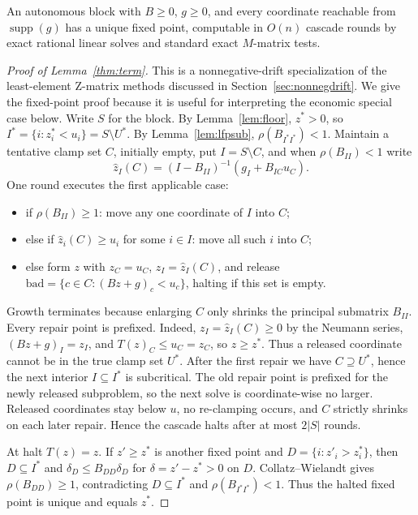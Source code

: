 \documentclass{llncs}
\begin{document}
\begin{lemma}
\label{thm:term}
An autonomous block with \(B\ge0\), \(g\ge0\), and every coordinate reachable from \(\operatorname{supp}(g)\) has a unique fixed point, computable in \(O(n)\) cascade rounds by exact rational linear solves and standard exact \(M\)-matrix tests.
\end{lemma}

\begin{proof}[Proof of Lemma~\ref{thm:term}]
This is a nonnegative-drift specialization of the least-element Z-matrix methods discussed in Section~\ref{sec:nonnegdrift}. We give the fixed-point proof because it is useful for interpreting the economic special case below.
Write \(S\) for the block. By Lemma~\ref{lem:floor}, \(z^\ast>0\), so \(I^\ast=\{i:z^\ast_i<u_i\}=S\setminus U^\ast\). By Lemma~\ref{lem:lfpsub}, \(\rho(B_{I^\ast I^\ast})<1\). Maintain a tentative clamp set \(C\), initially empty, put \(I=S\setminus C\), and when \(\rho(B_{II})<1\) write
\[
        \hat z_I(C)=(I-B_{II})^{-1}(g_I+B_{IC}u_C).
\]
One round executes the first applicable case:
\begin{itemize}[leftmargin=2.2em,itemsep=1pt]
\item[\textup{(G1)}] if \(\rho(B_{II})\ge1\): move any one coordinate of \(I\) into \(C\);
\item[\textup{(G2)}] else if \(\hat z_i(C)\ge u_i\) for some \(i\in I\): move all such \(i\) into \(C\);
\item[\textup{(R)}] else form \(z\) with \(z_C=u_C\), \(z_I=\hat z_I(C)\), and release \(\mathrm{bad}=\{c\in C:(Bz+g)_c<u_c\}\), halting if this set is empty.
\end{itemize}
Growth terminates because enlarging \(C\) only shrinks the principal submatrix \(B_{II}\). Every repair point is prefixed. Indeed, \(z_I=\hat z_I(C)\ge0\) by the Neumann series, \((Bz+g)_I=z_I\), and \(T(z)_C\le u_C=z_C\), so \(z\ge z^\ast\). Thus a released coordinate cannot be in the true clamp set \(U^\ast\). After the first repair we have \(C\supseteq U^\ast\), hence the next interior \(I\subseteq I^\ast\) is subcritical. The old repair point is prefixed for the newly released subproblem, so the next solve is coordinate-wise no larger. Released coordinates stay below \(u\), no re-clamping occurs, and \(C\) strictly shrinks on each later repair. Hence the cascade halts after at most \(2|S|\) rounds.

At halt \(T(z)=z\). If \(z'\ge z^\ast\) is another fixed point and \(D=\{i:z'_i>z^\ast_i\}\), then \(D\subseteq I^\ast\) and \(\delta_D\le B_{DD}\delta_D\) for \(\delta=z'-z^\ast>0\) on \(D\). Collatz--Wielandt gives \(\rho(B_{DD})\ge1\), contradicting \(D\subseteq I^\ast\) and \(\rho(B_{I^\ast I^\ast})<1\). Thus the halted fixed point is unique and equals \(z^\ast\).
\end{proof}
\end{document}
